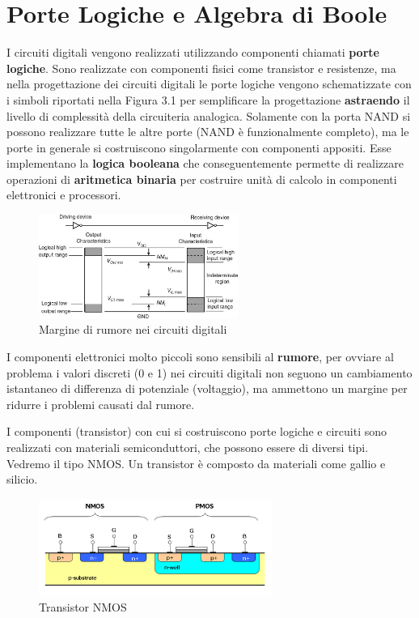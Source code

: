 \chapter{Porte Logiche e Algebra di Boole}

I circuiti digitali vengono realizzati utilizzando componenti chiamati \textbf{porte logiche}. Sono realizzate con componenti fisici come transistor e resistenze, ma nella progettazione dei circuiti digitali le porte logiche vengono schematizzate con i simboli riportati nella Figura 3.1 per semplificare la progettazione \textbf{astraendo} il livello di complessità della circuiteria analogica.
Solamente con la porta NAND si possono realizzare tutte le altre porte (NAND è funzionalmente completo), ma le porte in generale si costruiscono singolarmente con componenti appositi. Esse implementano la \textbf{logica booleana} che conseguentemente permette di realizzare operazioni di \textbf{aritmetica binaria} per costruire unità di calcolo in componenti elettronici e processori.

\begin{figure}
	\begin{center}
		\includegraphics[width=0.58\textwidth]{noisemargin}
	\end{center}
	\caption{Margine di rumore nei circuiti digitali}	
\end{figure}


I componenti elettronici molto piccoli sono sensibili al \textbf{rumore}, per ovviare al problema i valori discreti (0 e 1) nei circuiti digitali non seguono un cambiamento istantaneo di differenza di potenziale (voltaggio), ma ammettono un margine per ridurre i problemi causati dal rumore.


I componenti (transistor) con cui si costruiscono porte logiche e circuiti sono realizzati con materiali semiconduttori, che possono essere di diversi tipi. Vedremo il tipo NMOS. Un transistor è composto da materiali come gallio e silicio.

\begin{figure}
	\begin{center}
		\includegraphics[width=0.68\textwidth]{cmos}
	\end{center}
	\caption{Transistor NMOS}
\end{figure}


